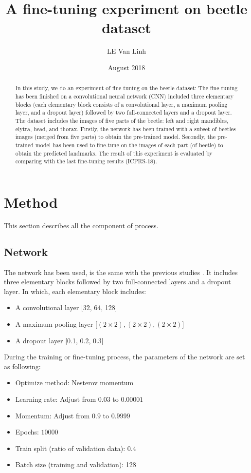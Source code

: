 \documentclass[12pt, a4paper]{article}
\begin{document}
\title{A fine-tuning experiment on beetle dataset}
\author{LE Van Linh}
\date{August 2018}
\maketitle

\begin{abstract}
In this study, we do an experiment of fine-tuning on the beetle dataset: The fine-tuning has been finished on a convolutional neural network (CNN) included three elementary blocks (each elementary block consists of a convolutional layer, a maximum pooling layer, and a dropout layer) followed by two full-connected layers and a dropout layer. The dataset includes the images of five parts of the beetle: left and right mandibles, elytra, head, and thorax. Firstly, the network has been trained with a subset of beetles images (merged from five parts) to obtain the pre-trained model. Secondly, the pre-trained model has been used to fine-tune on the images of each part (of beetle) to obtain the predicted landmarks. The result of this experiment is evaluated by comparing with the last fine-tuning results (ICPRS-18).
\end{abstract}

\section{Method}
This section describes all the component of process.
\subsection{Network}
The network has been used, is the same with the previous studies \cite{}. It includes three elementary blocks followed by two full-connected layers and a dropout layer. In which, each elementary block includes:
\begin{itemize}
	\item A convolutional layer [32, 64, 128]
	\item A maximum pooling layer [$(2 \times 2), (2 \times 2), (2 \times 2)$]
	\item A dropout layer [0.1, 0.2, 0.3]
\end{itemize}
During the training or fine-tuning process, the parameters of the network are set as following:
\begin{itemize}
	\item Optimize method: Nesterov momentum
	\item Learning rate: Adjust from $0.03$ to $0.00001$
	\item Momentum: Adjust from $0.9$ to $0.9999$
	\item Epochs: $10000$
	\item Train split (ratio of validation data): $0.4$ 
	\item Batch size (training and validation): 128
\end{itemize}
\end{document}

